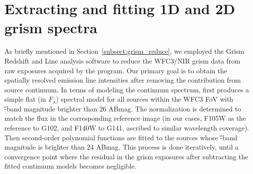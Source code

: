 \section{Extracting and fitting 1D and 2D \protect\hst grism spectra}\label{sect:grismspec}

As briefly mentioned in Section~\ref{subsect:grism_reduce}, we employed the Grism Redshift and Line analysis 
software \grzl to reduce the \hst WFC3/NIR grism data from raw exposures acquired by the \glass program.
Our primary goal is to obtain the spatially resolved emission line intensities after removing the contribution 
from source continuum.
In terms of modeling the continuum spectrum, \grzl first produces a simple flat (in $F_{\lambda}$)
spectral model for all sources within the WFC3 FoV with \H-band magnitude brighter than 26 ABmag.
The normalization is determined to match the flux in the corresponding reference image (in our cases, F105W as 
the reference to G102, and F140W to G141, ascribed to similar wavelength coverage).
Then second-order polynomial functions are fitted to the sources whose \H-band magnitude is brighter than 24 
ABmag.
This process is done iteratively, until a convergence point where the residual in the grism exposures after
subtracting the fitted continuum models becomes negligible.

